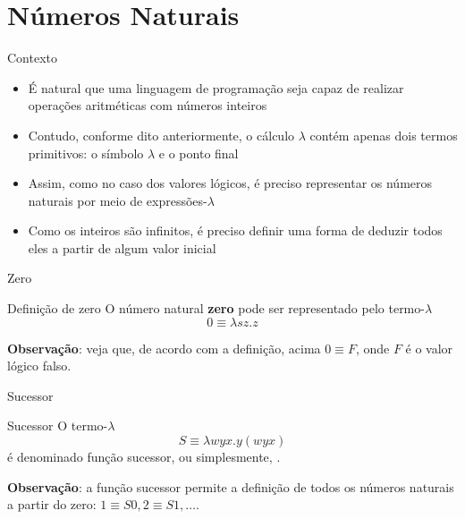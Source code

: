 \section{Números Naturais}

\begin{frame}[fragile]{Contexto}

    \begin{itemize}
        \item É natural que uma linguagem de programação seja capaz de realizar operações
            aritméticas com números inteiros

        \item Contudo, conforme dito anteriormente, o cálculo $\lambda$ contém apenas dois
            termos primitivos: o símbolo $\lambda$ e o ponto final

        \item Assim, como no caso dos valores lógicos, é preciso representar os números naturais
            por meio de expressões-$\lambda$

        \item Como os inteiros são infinitos, é preciso definir uma forma de deduzir todos eles
            a partir de algum valor inicial
    \end{itemize}

\end{frame}

\begin{frame}[fragile]{Zero}

    \begin{block}{Definição de zero}
        O número natural \textbf{zero} pode ser representado pelo termo-$\lambda$
        \[
            0 \equiv \lambda sz.z
        \]
    \end{block}

    \vspace{0.1in}

    \textbf{Observação}: veja que, de acordo com a definição, acima $0 \equiv F$, onde $F$ é o
        valor lógico falso.
\end{frame}

\begin{frame}[fragile]{Sucessor}

    \begin{block}{Sucessor}
        O termo-$\lambda$
        \[
            S \equiv \lambda wyx.y(wyx)
        \]
        é denominado função sucessor, ou simplesmente, .
    \end{block}

    \vspace{0.2in}

    \textbf{Observação}: a função sucessor permite a definição de todos os números naturais 
        a partir do zero: $1\equiv S0, 2\equiv S1, \ldots$.
\end{frame}

